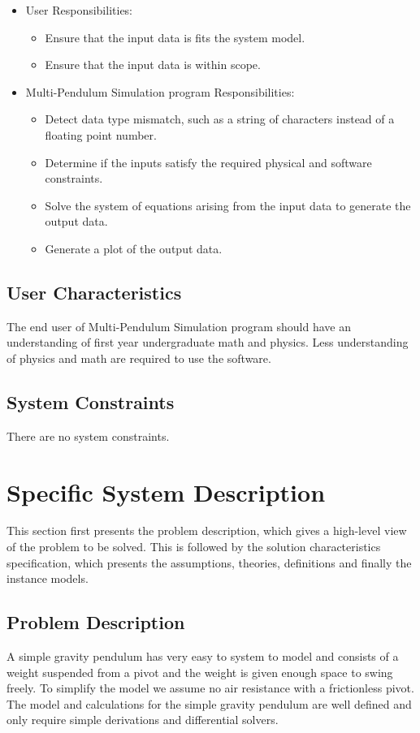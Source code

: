 \documentclass[12pt]{article}
\begin{document}
\begin{itemize}
\item User Responsibilities:
\begin{itemize}
\item Ensure that the input data is fits the system model.
\item Ensure that the input data is within scope.
\end{itemize}
\item Multi-Pendulum Simulation program Responsibilities:
\begin{itemize}
\item Detect data type mismatch, such as a string of characters instead of a
  floating point number.
\item Determine if the inputs satisfy the required physical and software 
  constraints.
\item Solve the system of equations arising from the input data to generate 
  the output data.
\item Generate a plot of the output data.
\end{itemize}
\end{itemize}

\subsection{User Characteristics}
The end user of Multi-Pendulum Simulation program should have an understanding of first year 
undergraduate math and physics. Less understanding of physics and math are required to use the software.

\subsection{System Constraints}
There are no system constraints.

\newpage
\section{Specific System Description}

This section first presents the problem description, which gives a high-level
view of the problem to be solved.  This is followed by the solution 
characteristics specification, which presents the assumptions, theories, 
definitions and finally the instance models.

\subsection{Problem Description}
A simple gravity pendulum has very easy to system to model and consists of a
weight suspended from a pivot and the weight is given enough space to swing
freely. To simplify the model we assume no air resistance with a frictionless
pivot. The model and calculations for the simple gravity pendulum are well
defined and only require simple derivations and differential solvers.
\end{document}
